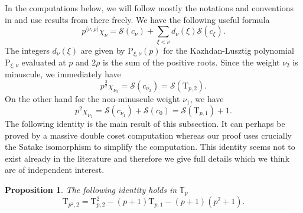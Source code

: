 \documentclass[10pt]{amsart}
\numberwithin{equation}{section}
\newtheorem{proposition}[equation]{Proposition}
\theoremstyle{definition}
\def\calS{\mathcal{S}}
\def\TT{\mathbb{T}}
\def\rmP{\mathrm{P}}
\def\rmT{\mathrm{T}}
\begin{document}
In the computations below, we will follow mostly the notations and conventions in \cite{Gross-Satake} and use results from there freely. We have the following useful formula \cite[3.12]{Gross-Satake}
\begin{equation*}
p^{\langle\nu, \rho\rangle}\chi_{\nu}=\calS(c_{\nu})+\sum_{\xi<\nu}d_{\nu}(\xi)\calS(c_{\xi}).
\end{equation*}
The integers $d_{\nu}(\xi)$ are given by $\rmP_{\xi, \nu}(p)$ for the Kazhdan-Lusztig polynomial $\rmP_{\xi, \nu}$ evaluated at $p$ and $2\rho$ is the sum of the positive roots. Since the weight $\nu_{2}$ is minuscule, we immediately have
\begin{equation*}
p^{\frac{3}{2}}\chi_{\nu_{2}}=\calS(c_{\nu_{2}})=\calS(\mathrm{T}_{p, 2}).
\end{equation*}
On the other hand for the non-minuscule weight $\nu_{1}$, we have
\begin{equation*}
p^{2}\chi_{\nu_{1}}=\calS(c_{\nu_{1}})+\calS(c_{0})=\calS(\mathrm{T}_{p, 1})+1.
\end{equation*}
The following identity is the main result of this subsection. It can perhaps be proved by a massive double coset computation whereas our proof uses crucially the Satake isomorphism to simplify the computation. This identity seems not to exist already in the literature and therefore we give full details which we think are of independent interest.
\begin{proposition}\label{Hecke-id}
The following identity holds in $\TT_{p}$
\begin{equation*}
\rmT_{p^{2}, 2}=\rmT^{2}_{p,2}-(p+1)\rmT_{p,1}-(p+1)(p^{2}+1).
\end{equation*}
\end{proposition}
\end{document}
